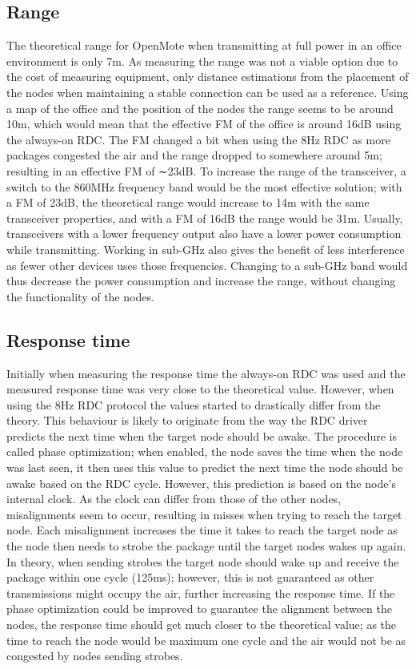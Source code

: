 \subsection{Range}

The theoretical range for OpenMote when transmitting at full power in an office environment is only 7m.
As measuring the range was not a viable option due to the cost of measuring equipment,
	only distance estimations from the placement of the nodes when maintaining a stable connection can be used as a reference.
Using a map of the office and the position of the nodes the range seems to be around 10m,
	which would mean that the effective FM of the office is around 16dB using the always-on RDC.
The FM changed a bit when using the 8Hz RDC as more packages congested the air and the range dropped to somewhere around 5m;
	resulting in an effective FM of ∼23dB.
To increase the range of the transceiver,
	a switch to the 860MHz frequency band would be the most effective solution;
	with a FM of 23dB,
	the theoretical range would increase to 14m with the same transceiver properties,
	and with a FM of 16dB the range would be 31m.
Usually,
	transceivers with a lower frequency output also have a lower power consumption while transmitting.
Working in sub-GHz also gives the benefit of less interference as fewer other devices uses those frequencies.
Changing to a sub-GHz band would thus decrease the power consumption and increase the range,
	without changing the functionality of the nodes.

\subsection{Response time}

Initially when measuring the response time the always-on RDC was used and the measured response time was very close to the theoretical value.
However,
	when using the 8Hz RDC protocol the values started to drastically differ from the theory.
This behaviour is likely to originate from the way the RDC driver predicts the next time when the target node should be awake.
The procedure is called phase optimization;
	when enabled,
	the node saves the time when the node was last seen,
	it then uses this value to predict the next time the node should be awake based on the RDC cycle.
However,
	this prediction is based on the node’s internal clock.
As the clock can differ from those of the other nodes,
	misalignments seem to occur,
	resulting in misses when trying to reach the target node.
Each misalignment increases the time it takes to reach the target node as the node then needs to strobe the package until the target nodes wakes up again.
In theory,
	when sending strobes the target node should wake up and receive the package within one cycle (125ms);
	however,
	this is not guaranteed as other transmissions might occupy the air,
	further increasing the response time.
If the phase optimization could be improved to guarantee the alignment between the nodes,
	the response time should get much closer to the theoretical value;
	as the time to reach the node would be maximum one cycle and the air would not be as congested by nodes sending strobes.

